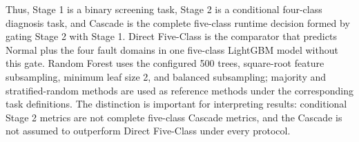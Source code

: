 Thus, Stage 1 is a binary screening task, Stage 2 is a conditional four-class diagnosis task, and Cascade is the complete five-class runtime decision formed by gating Stage 2 with Stage 1. Direct Five-Class is the comparator that predicts Normal plus the four fault domains in one five-class LightGBM model without this gate. Random Forest uses the configured 500 trees, square-root feature subsampling, minimum leaf size 2, and balanced subsampling; majority and stratified-random methods are used as reference methods under the corresponding task definitions. The distinction is important for interpreting results: conditional Stage 2 metrics are not complete five-class Cascade metrics, and the Cascade is not assumed to outperform Direct Five-Class under every protocol.
